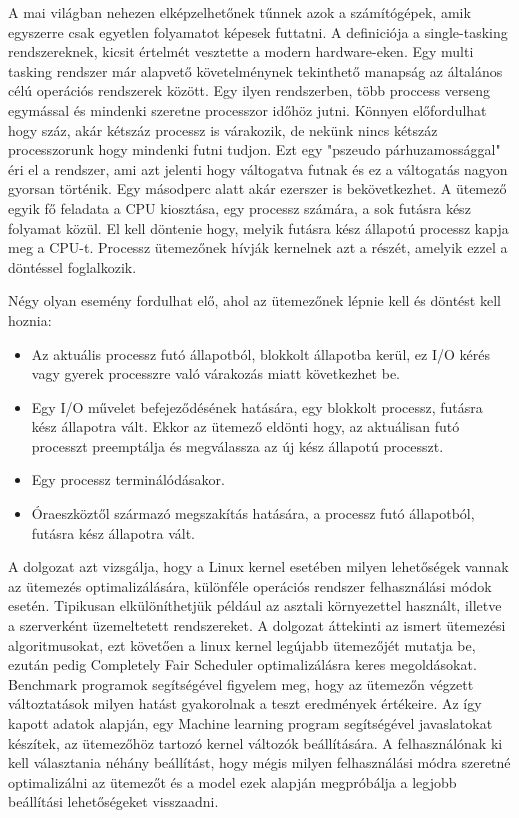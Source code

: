 
A mai világban nehezen elképzelhetőnek tűnnek azok a számítógépek, amik egyszerre csak egyetlen folyamatot képesek futtatni.
A definiciója a single-tasking rendszereknek, kicsit értelmét vesztette a modern hardware-eken. Egy multi tasking rendszer már alapvető követelménynek tekinthető manapság az általános célú operációs rendszerek között. Egy ilyen rendszerben, több proccess verseng egymással és mindenki szeretne processzor időhöz jutni. Könnyen előfordulhat hogy száz, akár kétszáz processz is várakozik, de nekünk nincs kétszáz processzorunk hogy mindenki futni tudjon. Ezt egy "pszeudo párhuzamossággal" éri el a rendszer, ami azt jelenti hogy váltogatva futnak és ez a váltogatás nagyon gyorsan történik. Egy másodperc alatt akár ezerszer is bekövetkezhet.
A ütemező egyik fő feladata a CPU kiosztása, egy processz számára, a sok futásra kész folyamat közül. El kell döntenie hogy, melyik futásra kész állapotú processz kapja meg a CPU-t.
Processz ütemezőnek hívják kernelnek azt a részét, amelyik ezzel a döntéssel foglalkozik.

Négy olyan esemény fordulhat elő, ahol az ütemezőnek lépnie kell és döntést kell hoznia:
\begin{itemize}
  \item Az aktuális processz futó állapotból, blokkolt állapotba kerül, ez I/O kérés vagy gyerek processzre való várakozás miatt következhet be.
  \item Egy I/O művelet befejeződésének hatására, egy blokkolt processz, futásra kész állapotra vált. Ekkor az ütemező eldönti hogy, az aktuálisan futó processzt preemptálja és megválassza az új kész állapotú processzt.
  \item Egy processz terminálódásakor.
  \item Óraeszköztől származó megszakítás hatására, a processz futó állapotból, futásra kész állapotra vált. 
\end{itemize}

A dolgozat azt vizsgálja, hogy a Linux kernel esetében milyen lehetőségek vannak az ütemezés optimalizálására, különféle operációs rendszer felhasználási módok esetén. Tipikusan elkülöníthetjük például az asztali környezettel használt, illetve a szerverként üzemeltetett rendszereket. A dolgozat áttekinti az ismert ütemezési algoritmusokat, ezt követően a linux kernel legújabb ütemezőjét mutatja be, ezután pedig Completely Fair Scheduler optimalizálásra keres megoldásokat. Benchmark programok segítségével figyelem meg, hogy az ütemezőn végzett változtatások milyen hatást gyakorolnak a teszt eredmények értékeire.
Az így kapott adatok alapján, egy Machine learning program segítségével javaslatokat készítek, az ütemezőhöz tartozó kernel változók beállítására. A felhasználónak ki kell választania néhány beállítást, hogy mégis milyen felhasználási módra szeretné optimalizálni az ütemezőt és a model ezek alapján megpróbálja a legjobb beállítási lehetőségeket visszaadni. 

